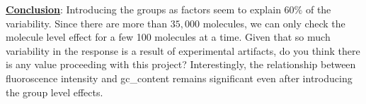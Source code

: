 \documentclass[11pt]{article}
\begin{document}
\noindent
{\bf{\underline{Conclusion}}}: Introducing the groups as factors seem to explain $60\%$ of the variability. Since there are more than $35,000$ molecules, we can only check the molecule level effect for a few 100 molecules at a time. Given that so much variability in the response is a result of experimental artifacts, do you think there is any value proceeding with this project? Interestingly, the relationship between fluoroscence intensity and gc\_content remains significant even after introducing the group level effects.
\end{document}
